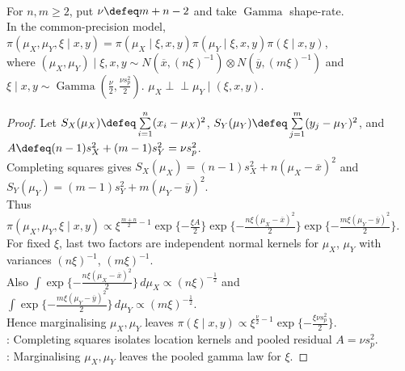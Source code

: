 \begin{proposition} \label{prop:bayesian-two-sample-conditional-posterior} \\
For $n,m\geq2$, put $\nu\defeq m+n-2$ and take $\operatorname{Gamma}$ shape-rate.\\
In the common-precision model, $\pi(\mu_X,\mu_Y,\xi\mid x,y)=\pi(\mu_X\mid\xi,x,y)\pi(\mu_Y\mid\xi,x,y)\pi(\xi\mid x,y)$,\\
where $(\mu_X,\mu_Y)\mid\xi,x,y\sim N(\overline{x},(n\xi)^{-1})\otimes N(\overline{y},(m\xi)^{-1})$ and $\xi\mid x,y\sim\operatorname{Gamma}(\frac{\nu}{2},\frac{\nu s_p^2}{2})$. $\mu_X\perp\!\!\!\perp\mu_Y\mid(\xi,x,y)$.
\begin{proof} Let $S_X(\mu_X)\defeq\sum\limits_{i=1}^{n}(x_i-\mu_X)^2$, $S_Y(\mu_Y)\defeq\sum\limits_{j=1}^{m}(y_j-\mu_Y)^2$, and $A\defeq(n-1)s_X^2+(m-1)s_Y^2=\nu s_p^2$.\\
Completing squares gives $S_X(\mu_X)=(n-1)s_X^2+n(\mu_X-\overline{x})^2$ and $S_Y(\mu_Y)=(m-1)s_Y^2+m(\mu_Y-\overline{y})^2$.\\
Thus $\pi(\mu_X,\mu_Y,\xi\mid x,y)\propto\xi^{\frac{m+n}{2}-1}\exp\{-\frac{\xi A}{2}\}\exp\{-\frac{n\xi(\mu_X-\overline{x})^2}{2}\}\exp\{-\frac{m\xi(\mu_Y-\overline{y})^2}{2}\}$.\\
For fixed $\xi$, last two factors are independent normal kernels for $\mu_X$, $\mu_Y$ with variances $(n\xi)^{-1}$, $(m\xi)^{-1}$.\\
Also $\int\exp\{-\frac{n\xi(\mu_X-\overline{x})^2}{2}\}\,d\mu_X\propto(n\xi)^{-\frac{1}{2}}$ and $\int\exp\{-\frac{m\xi(\mu_Y-\overline{y})^2}{2}\}\,d\mu_Y\propto(m\xi)^{-\frac{1}{2}}$.\\
Hence marginalising $\mu_X,\mu_Y$ leaves $\pi(\xi\mid x,y)\propto\xi^{\frac{\nu}{2}-1}\exp\{-\frac{\xi\nu s_p^2}{2}\}$.\\
: Completing squares isolates location kernels and pooled residual $A=\nu s_p^2$.\\
: Marginalising $\mu_X,\mu_Y$ leaves the pooled gamma law for $\xi$.
\end{proof}
\end{proposition}

